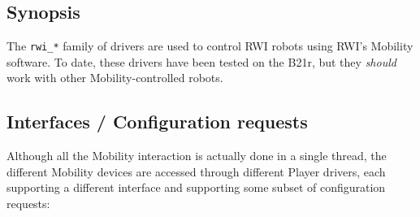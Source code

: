 \subsection*{Synopsis}
The {\tt rwi\_*} family of drivers are used to control RWI robots using
RWI's Mobility software.  To date, these drivers have been tested on the
B21r, but they {\em should} work with other Mobility-controlled robots.


\subsection*{Interfaces / Configuration requests}
Although all the Mobility interaction is actually done in a single thread, the
different Mobility devices are accessed through different Player drivers, each
supporting a different interface and supporting some subset of configuration
requests:
